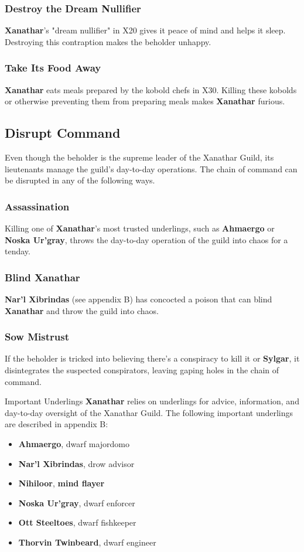 \documentclass[10pt,a4paper,twoside,twocolumn,openany,nodeprecatedcode]{dndbook}
\begin{document}
\subsubsection{Destroy the Dream Nullifier}
\textbf{Xanathar}'s "dream nullifier" in X20 gives it peace of mind and helps it sleep. Destroying this contraption makes the beholder unhappy.
\subsubsection{Take Its Food Away}
\textbf{Xanathar} eats meals prepared by the kobold chefs in X30. Killing these kobolds or otherwise preventing them from preparing meals makes \textbf{Xanathar} furious.
\subsection{Disrupt Command}
Even though the beholder is the supreme leader of the Xanathar Guild, its lieutenants manage the guild's day-to-day operations. The chain of command can be disrupted in any of the following ways.
\subsubsection{Assassination}
Killing one of \textbf{Xanathar}'s most trusted underlings, such as \textbf{Ahmaergo} or \textbf{Noska Ur'gray}, throws the day-to-day operation of the guild into chaos for a tenday.
\subsubsection{Blind Xanathar}
\textbf{Nar'l Xibrindas} (see appendix B) has concocted a poison that can blind \textbf{Xanathar} and throw the guild into chaos.
\subsubsection{Sow Mistrust}
If the beholder is tricked into believing there's a conspiracy to kill it or \textbf{Sylgar}, it disintegrates the suspected conspirators, leaving gaping holes in the chain of command.
\begin{DndComment}{Important Underlings}
\textbf{Xanathar} relies on underlings for advice, information, and day-to-day oversight of the Xanathar Guild. The following important underlings are described in appendix B:
\begin{itemize}

\item \textbf{Ahmaergo}, dwarf majordomo
\item \textbf{Nar'l Xibrindas}, drow advisor
\item \textbf{Nihiloor}, \textbf{mind flayer}
\item \textbf{Noska Ur'gray}, dwarf enforcer
\item \textbf{Ott Steeltoes}, dwarf fishkeeper
\item \textbf{Thorvin Twinbeard}, dwarf engineer
\end{itemize}


\end{DndComment}
\end{document}
